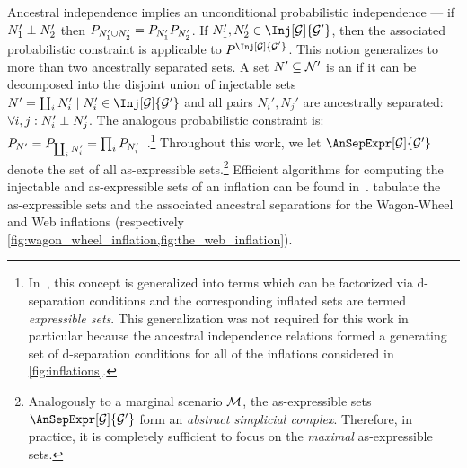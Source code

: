 \documentclass[aps, 10pt, english, twoside, pra, nofootinbib, tightenlines, longbibliography, superscriptaddress]{revtex4-1}
\begin{document}
    Ancestral independence implies an unconditional probabilistic independence --- if $N_1' \perp N_2'$ then $\prob[N_1' \cup N_2'] = \prob[N_1']\prob[N_2']$. If $N_1', N_2' \in \Inj[\graph]{\graph'}$, then the associated probabilistic constraint is applicable to $\prob^{\Inj[\graph]{\graph'}}$. This notion generalizes to more than two ancestrally separated sets. A set $N' \subseteq \mathcal{N}'$ is an  if it can be decomposed into the disjoint union of injectable sets $N' = \coprod_{i} N'_i \mid N'_i \in \Inj[\graph]{\graph'}$ and all pairs $N_i', N_j'$ are ancestrally separated: $\forall i, j : N_i' \perp N_j'$. The analogous probabilistic constraint is: $\prob[N'] = \prob[\coprod_i N'_i] = \prod_{i}\prob[N'_i]$~\cite{Pearl_2009}.\footnote{In~\cite{Inflation}, this concept is generalized into terms which can be factorized via d-separation conditions and the corresponding inflated sets are termed \textit{expressible sets}. This generalization was not required for this work in particular because the ancestral independence relations formed a generating set of d-separation conditions for all of the inflations considered in \cref{fig:inflations}.} Throughout this work, we let $\AnSepExpr[\graph]{\graph'}$ denote the set of all as-expressible sets.\footnote{Analogously to a marginal scenario $\mathcal{M}$, the as-expressible sets $\AnSepExpr[\graph]{\graph'}$ form an \textit{abstract simplicial complex}. Therefore, in practice, it is completely sufficient to focus on the \textit{maximal} as-expressible sets.} Efficient algorithms for computing the injectable and as-expressible sets of an inflation can be found in~\cite{Inflation}.  tabulate the as-expressible sets and the associated ancestral separations for the Wagon-Wheel and Web inflations (respectively \cref{fig:wagon_wheel_inflation,fig:the_web_inflation}).
\end{document}

